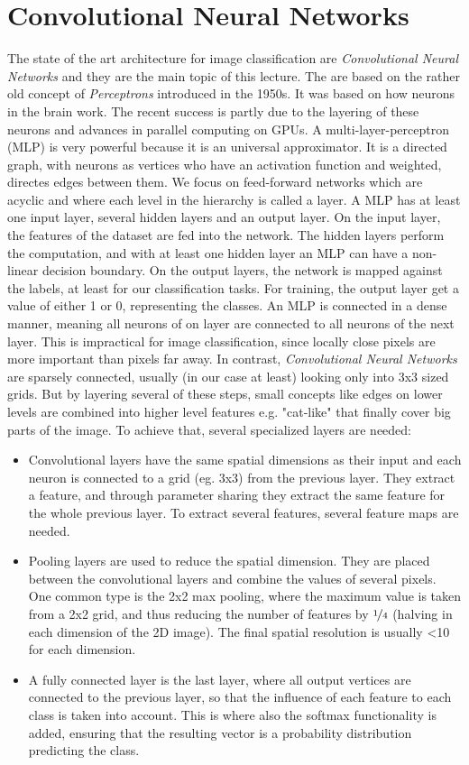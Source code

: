 \section{Convolutional Neural Networks}
The state of the art architecture for image classification are \emph{Convolutional Neural Networks} and they are the main topic of this lecture. The are based on the rather old concept of \emph{Perceptrons} introduced in the 1950s\cite{Rosenblatt1958}. It was based on how neurons in the brain work. The recent success is partly due to the layering of these neurons and advances in parallel computing on GPUs. A multi-layer-perceptron (MLP) is very powerful because it is an universal approximator.  It is a directed graph, with neurons as vertices who have an activation function and weighted, directes edges between them. We focus on feed-forward networks which are acyclic and where each level in the hierarchy is called a layer. A MLP has at least one input layer, several hidden layers and an output layer. On the input layer, the features of the dataset are fed into the network. The hidden layers perform the computation, and with at least one hidden layer an MLP can have a non-linear decision boundary. On the output layers, the network is mapped against the labels, at least for our classification tasks. For training, the output layer get a value of either 1 or 0, representing the classes. An MLP is connected in a dense manner, meaning all neurons of on layer are connected to all neurons of the next layer. This is impractical for image classification, since locally close pixels are more important than pixels far away. 
In contrast, \emph{Convolutional Neural Networks} are sparsely connected, usually (in our case at least) looking only into 3x3 sized grids. But by layering several of these steps, small concepts like edges on lower levels are combined into higher level features e.g. "cat-like" that finally cover big parts of the image. To achieve that, several specialized layers are needed:
\begin{itemize}
\item Convolutional layers have the same spatial dimensions as their input and each neuron is connected to a grid (eg. 3x3) from the previous layer. They extract a feature, and through parameter sharing they extract the same feature for the whole previous layer. To extract several features, several feature maps are needed.  
\item Pooling layers are used to reduce the spatial dimension. They are placed between the convolutional layers and combine the values of several pixels. One common type is the 2x2 max pooling, where the maximum value is taken from a 2x2 grid, and thus reducing the number of features by $\nicefrac 1 4$ (halving in each dimension of the 2D image). The final spatial resolution is usually <10 for each dimension. 
\item A fully connected layer is the last layer, where all output vertices are connected to the previous layer, so that the influence of each feature to each class is taken into account. This is where also the softmax functionality is added, ensuring that the resulting vector is a probability distribution predicting the class. 
\end{itemize}

